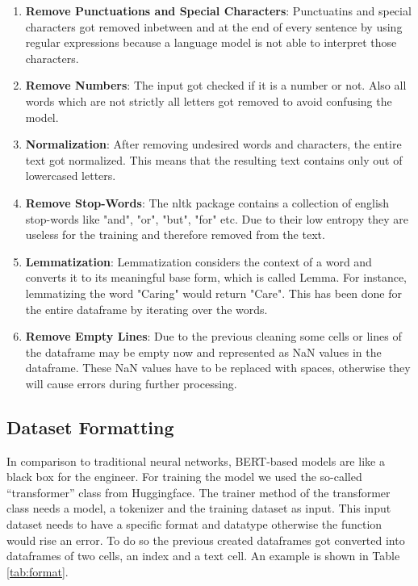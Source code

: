 \begin{enumerate}
	\item \textbf{Remove Punctuations and Special Characters}: Punctuatins and special characters got removed inbetween and at the end of every sentence by using regular expressions because a language model is not able to interpret those characters. 
	\item \textbf{Remove Numbers}: The input got checked if it is a number or not. Also all words which are not strictly all letters got removed to avoid confusing the model.
	\item \textbf{Normalization}: After removing undesired words and characters, the entire text got normalized. This means that the resulting text contains only out of lowercased letters.
	\item \textbf{Remove Stop-Words}: The nltk package contains a collection of english stop-words like "and", "or", "but", "for" etc. Due to their low entropy they are useless for the training and therefore removed from the text.
	\item \textbf{Lemmatization}: Lemmatization considers the context of a word and converts it to its meaningful base form, which is called Lemma. For instance, lemmatizing the word "Caring" would return "Care". This has been done for the entire dataframe by iterating over the words.
	\item \textbf{Remove Empty Lines}: Due to the previous cleaning some cells or lines of the dataframe may be empty now and represented as NaN values in the dataframe. These NaN values have to be replaced with spaces, otherwise they will cause errors during further processing.
\end{enumerate}


\subsection{Dataset Formatting}\label{chapter:data_format}
In comparison to traditional neural networks, BERT-based models are like a black box for the engineer. For training the model we used the so-called “transformer” class from \alert{Huggingface}.  The trainer method of the transformer class needs a model, a tokenizer and the training dataset as input. This input dataset needs to have a specific format and datatype otherwise the function would rise an error.  To do so the previous created dataframes got converted into dataframes of two cells, an index and a text cell. An example is shown in Table \ref{tab:format}.

